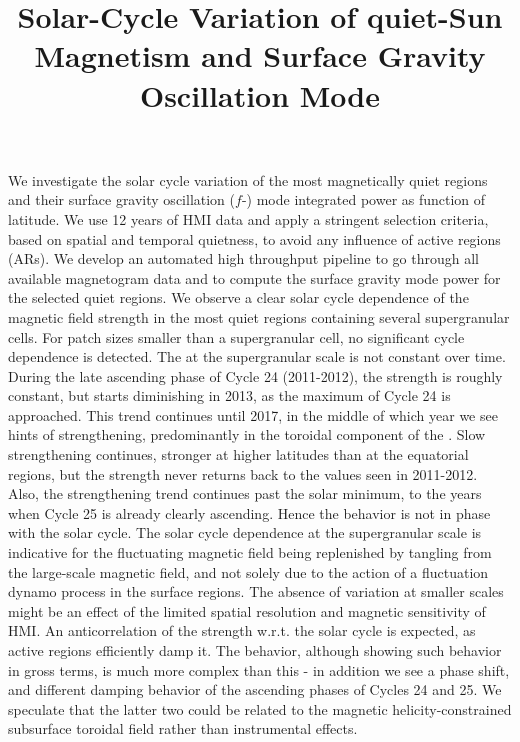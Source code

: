\documentclass{aa}
\begin{document}
\title{Solar-Cycle Variation of quiet-Sun Magnetism and Surface Gravity Oscillation Mode}



{We investigate the solar cycle variation of the most magnetically quiet regions and
their surface gravity oscillation ($f$-) mode integrated power as function of latitude.}
{We use 12 years of HMI data and apply a stringent selection criteria, based on
spatial and temporal quietness, to avoid any influence of active regions (ARs).
We develop an automated high throughput pipeline to go through all available magnetogram data
and to compute the surface gravity mode power for the selected quiet regions.}
{We observe a clear solar cycle dependence of the magnetic field strength in the most
quiet regions containing several supergranular cells. For patch sizes smaller than a supergranular
cell, no significant cycle dependence is detected. The \fff at the supergranular scale 
is not constant over time.
During the late ascending phase of Cycle 24 (2011-2012), the \fff strength is roughly constant, but starts diminishing in 2013, as the maximum of Cycle 24 is approached. This trend continues
until 2017, in the middle of which year we see hints of strengthening,
predominantly in the toroidal component of the \fff.
Slow strengthening continues, stronger at higher latitudes than at the equatorial regions, but the \fff strength never returns back to the values seen in 2011-2012. Also, the strengthening trend continues past the solar minimum, to the years when Cycle 25 is already clearly ascending. Hence the \fff behavior is not in phase with the solar cycle. 
}
{The solar cycle dependence at the supergranular scale is indicative for the fluctuating magnetic
field being replenished by tangling from the large-scale magnetic field, and not solely due to
the action of a fluctuation dynamo process in the surface regions. 
The absence of variation at smaller scales might be an effect of the
limited spatial resolution and magnetic sensitivity of HMI.
An anticorrelation of the \fff strength w.r.t. the solar cycle is expected, as active regions efficiently damp it. The \fff behavior, although showing such behavior in gross terms, is much more complex than this - in addition we see a phase shift, and different damping behavior of the ascending phases of Cycles 24 and 25. We speculate that the latter two could be related to the magnetic helicity-constrained subsurface toroidal field rather than instrumental effects. 
}
\end{document}
